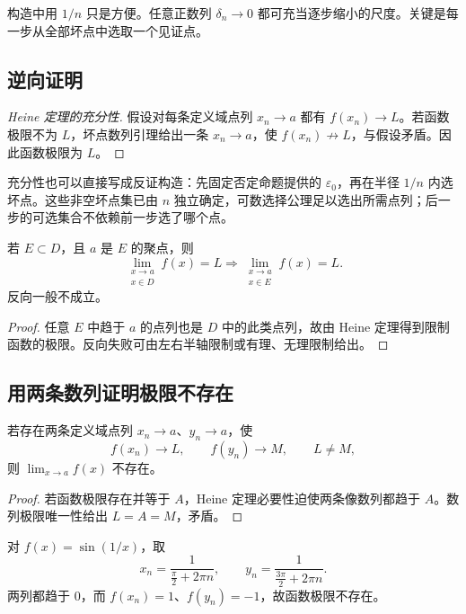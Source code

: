 \begin{remark}
构造中用 \(1/n\) 只是方便。任意正数列 \(\delta_n\to0\) 都可充当逐步缩小的尺度。关键是每一步从全部坏点中选取一个见证点。
\end{remark}

\subsection{逆向证明}

\begin{proof}[Heine 定理的充分性]
假设对每条定义域点列 \(x_n\to a\) 都有 \(f(x_n)\to L\)。若函数极限不为 \(L\)，坏点数列引理给出一条 \(x_n\to a\)，使 \(f(x_n)\not\to L\)，与假设矛盾。因此函数极限为 \(L\)。
\end{proof}

充分性也可以直接写成反证构造：先固定否定命题提供的 \(\varepsilon_0\)，再在半径 \(1/n\) 内选坏点。这些非空坏点集已由 \(n\) 独立确定，可数选择公理足以选出所需点列；后一步的可选集合不依赖前一步选了哪个点。

\begin{proposition}[定义域限制]
若 \(E\subset D\)，且 \(a\) 是 \(E\) 的聚点，则
\[
 \lim_{\substack{x\to a\\x\in D}}f(x)=L
 \Longrightarrow
 \lim_{\substack{x\to a\\x\in E}}f(x)=L.
\]
反向一般不成立。
\end{proposition}

\begin{proof}
任意 \(E\) 中趋于 \(a\) 的点列也是 \(D\) 中的此类点列，故由 Heine 定理得到限制函数的极限。反向失败可由左右半轴限制或有理、无理限制给出。
\end{proof}

\subsection{用两条数列证明极限不存在}

\begin{proposition}[双路径判别]
若存在两条定义域点列 \(x_n\to a\)、\(y_n\to a\)，使
\[
 f(x_n)\to L,\qquad f(y_n)\to M,\qquad L\ne M,
\]
则 \(\lim_{x\to a}f(x)\) 不存在。
\end{proposition}

\begin{proof}
若函数极限存在并等于 \(A\)，Heine 定理必要性迫使两条像数列都趋于 \(A\)。数列极限唯一性给出 \(L=A=M\)，矛盾。
\end{proof}

\begin{example}
对 \(f(x)=\sin(1/x)\)，取
\[
 x_n=\frac1{\frac\pi2+2\pi n},\qquad
 y_n=\frac1{\frac{3\pi}2+2\pi n}.
\]
两列都趋于 \(0\)，而 \(f(x_n)=1\)、\(f(y_n)=-1\)，故函数极限不存在。
\end{example}

